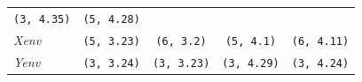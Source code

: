\documentclass[12pt,A4paper,authoryear]{elsarticle} %
\theoremstyle{definition}
\theoremstyle{definition}
\theoremstyle{remark}
\begin{document}
\begin{longtable}[]{@{}lcccc@{}}
\begin{minipage}[t]{0.19\columnwidth}
\texttt{(3,\ 4.35)}\strut
\end{minipage} & \begin{minipage}[t]{0.19\columnwidth}\centering\strut
\texttt{(5,\ 4.28)}\strut
\end{minipage}\tabularnewline
\begin{minipage}[t]{0.09\columnwidth}\raggedright\strut
\emph{Xenv}\strut
\end{minipage} & \begin{minipage}[t]{0.19\columnwidth}\centering\strut
\texttt{(5,\ 3.23)}\strut
\end{minipage} & \begin{minipage}[t]{0.19\columnwidth}\centering\strut
\texttt{(6,\ 3.2)}\strut
\end{minipage} & \begin{minipage}[t]{0.19\columnwidth}\centering\strut
\texttt{(5,\ 4.1)}\strut
\end{minipage} & \begin{minipage}[t]{0.19\columnwidth}\centering\strut
\texttt{(6,\ 4.11)}\strut
\end{minipage}\tabularnewline
\begin{minipage}[t]{0.09\columnwidth}\raggedright\strut
\emph{Yenv}\strut
\end{minipage} & \begin{minipage}[t]{0.19\columnwidth}\centering\strut
\texttt{(3,\ 3.24)}\strut
\end{minipage} & \begin{minipage}[t]{0.19\columnwidth}\centering\strut
\texttt{(3,\ 3.23)}\strut
\end{minipage} & \begin{minipage}[t]{0.19\columnwidth}\centering\strut
\texttt{(3,\ 4.29)}\strut
\end{minipage} & \begin{minipage}[t]{0.19\columnwidth}\centering\strut
\texttt{(3,\ 4.24)}\strut
\end{minipage}\tabularnewline
\bottomrule
\end{longtable}
\end{document}
